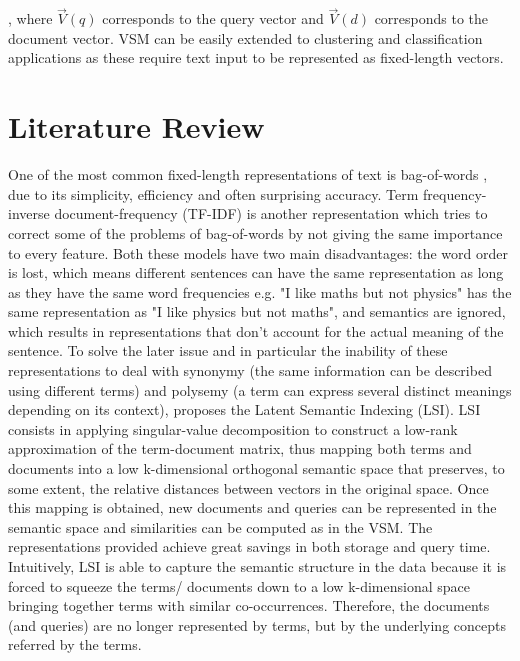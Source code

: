 \documentclass[a4paper]{article}
\begin{document}
, where $\overrightarrow{V}(q)$ corresponds to the query vector and $\overrightarrow{V}(d)$ corresponds to the document vector. VSM can be easily extended to clustering and classification applications as these require text input to be represented as fixed-length vectors. 


\section*{Literature Review}
One of the most common fixed-length representations of text is bag-of-words \citep{harris1954}, due to its simplicity, efficiency and often surprising accuracy. Term frequency-inverse document-frequency (TF-IDF) \citep{jones1972} is another representation which tries to correct some of the problems of bag-of-words by not giving the same importance to every feature. Both these models have two main disadvantages: the word order is lost, which means different sentences can have the same representation as long as they have the same word frequencies e.g. "I like maths but not physics" has the same representation as "I like physics but not maths", and semantics are ignored, which results in representations that don't account for the actual meaning of the sentence. To solve the later issue and in particular the inability of these representations to deal with synonymy (the same information can be described using different terms) and polysemy (a term can express several distinct meanings depending on its context), \citet{deerwester1990} proposes the Latent Semantic Indexing (LSI). LSI consists in applying singular-value decomposition to construct a low-rank approximation of the term-document matrix, thus mapping both terms and documents into a low k-dimensional orthogonal semantic space that preserves, to some extent, the relative distances between vectors in the original space. Once this mapping is obtained, new documents and queries can be represented in the semantic space and similarities can be computed as in the VSM. The representations provided achieve great savings in both storage and query time. Intuitively, LSI is able to capture the semantic structure in the data because it is forced to squeeze the terms/ documents down to a low k-dimensional space bringing together terms with similar co-occurrences. Therefore, the documents (and queries) are no longer represented by terms, but by the underlying concepts referred by the terms. 
\end{document}
